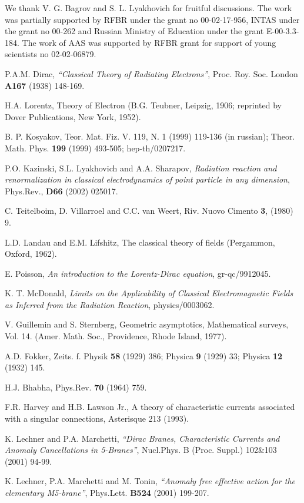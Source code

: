 \documentclass[a4paper,12pt]{article}
\begin{document}
We thank V. G. Bagrov and S. L. Lyakhovich for fruitful
discussions. The work was partially supported by RFBR under the
grant no 00-02-17-956, INTAS under the grant no 00-262 and Russian
Ministry of Education under the grant E-00-3.3-184. The work of
AAS was supported by RFBR grant for support of young scientists
no 02-02-06879.


\begin{thebibliography}{99}


  P.A.M. Dirac, {\it ``Classical Theory of Radiating Electrons''},
Proc. Roy. Soc. London {\bf A167} (1938) 148-169.

  H.A. Lorentz, Theory of Electron (B.G. Teubner, Leipzig,
1906; reprinted by Dover Publications, New York, 1952).


  B. P. Kosyakov, Teor. Mat. Fiz. V. 119, N. 1 (1999) 119-136
(in russian); Theor. Math. Phys. {\bf 199} (1999) 493-505;
hep-th/0207217.


 P.O. Kazinski, S.L. Lyakhovich and A.A. Sharapov, {\it Radiation
reaction and renormalization in classical electrodynamics of
point particle in any dimension}, Phys.Rev., {\bf D66} (2002)
025017.


  C. Teitelboim, D. Villarroel and C.C. van Weert, Riv. Nuovo
Cimento {\bf 3}, (1980) 9.

 L.D. Landau and E.M. Lifshitz, The classical theory
of fields (Pergammon, Oxford, 1962).

  E. Poisson, {\it An introduction to the Lorentz-Dirac
equation},  gr-qc/9912045.


 K. T. McDonald, {\it Limits on the Applicability of Classical Electromagnetic
Fields as Inferred from the Radiation Reaction}, physics/0003062.


 V. Guillemin and S. Sternberg, Geometric
asymptotics, Mathematical surveys, Vol. 14. (Amer. Math. Soc.,
Providence, Rhode Island, 1977).


 A.D. Fokker, Zeits. f. Physik {\bf 58} (1929) 386; Physica
{\bf 9} (1929) 33; Physica {\bf 12} (1932) 145.


 H.J. Bhabha, Phys.Rev. {\bf 70} (1964) 759.


 F.R. Harvey and H.B. Lawson Jr., A theory of characteristic currents
associated with a singular connections, Asterisque 213 (1993).

 K. Lechner and P.A. Marchetti, {\it ``Dirac Branes, Characteristic Currents
and Anomaly Cancellations in 5-Branes''}, Nucl.Phys. B (Proc.
Suppl.) 102\&103 (2001) 94-99.

 K. Lechner, P.A. Marchetti and M. Tonin, {\it ``Anomaly free effective action
for the elementary M5-brane''}, Phys.Lett. {\bf B524} (2001)
199-207.

\end{thebibliography}
\end{document}
